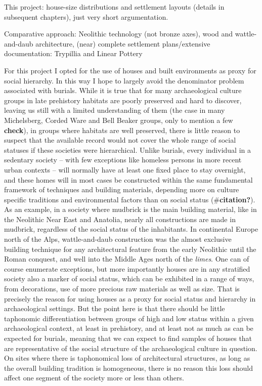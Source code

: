 \documentclass[
  12pt,
  a4paper, twoside]{book}
\begin{document}
This project: house-size distributions and settlement layouts (details in subsequent chapters), just very short argumentation.

Comparative approach: Neolithic technology (not bronze axes), wood and wattle-and-daub architecture, (near) complete settlement plans/extensive documentation: Trypillia and Linear Pottery

For this project I opted for the use of houses and built environments as proxy for social hierarchy. In this way I hope to largely avoid the denominator problem associated with burials. While it is true that for many archaeological culture groups in late prehistory habitats are poorly preserved and hard to discover, leaving us still with a limited understanding of them (the case in many Michelsberg, Corded Ware and Bell Beaker groups, only to mention a few \textbf{check}), in groups where habitats are well preserved, there is little reason to suspect that the available record would not cover the whole range of social statuses if these societies were hierarchical. Unlike burials, every individual in a sedentary society -- with few exceptions like homeless persons in more recent urban contexts -- will normally have at least one fixed place to stay overnight, and these homes will in most cases be constructed within the same fundamental framework of techniques and building materials, depending more on culture specific traditions and environmental factors than on social status (\#\textbf{citation?}). As an example, in a society where mudbrick is the main building material, like in the Neolithic Near East and Anatolia, nearly all constructions are made in mudbrick, regardless of the social status of the inhabitants. In continental Europe north of the Alps, wattle-and-daub construction was the almost exclusive building technique for any architectural feature from the early Neolithic until the Roman conquest, and well into the Middle Ages north of the \emph{limes}. One can of course enumerate exceptions, but more importantly houses are in any stratified society also a marker of social status, which can be exhibited in a range of ways, from decorations, use of more precious raw materials as well as size. That is precisely the reason for using houses as a proxy for social status and hierarchy in archaeological settings. But the point here is that there should be little taphonomic differentiation between groups of high and low status within a given archaeological context, at least in prehistory, and at least not as much as can be expected for burials, meaning that we can expect to find samples of houses that are representative of the social structure of the archaeological culture in question. On sites where there is taphonomical loss of architectural structures, as long as the overall building tradition is homogeneous, there is no reason this loss should affect one segment of the society more or less than others.
\end{document}
